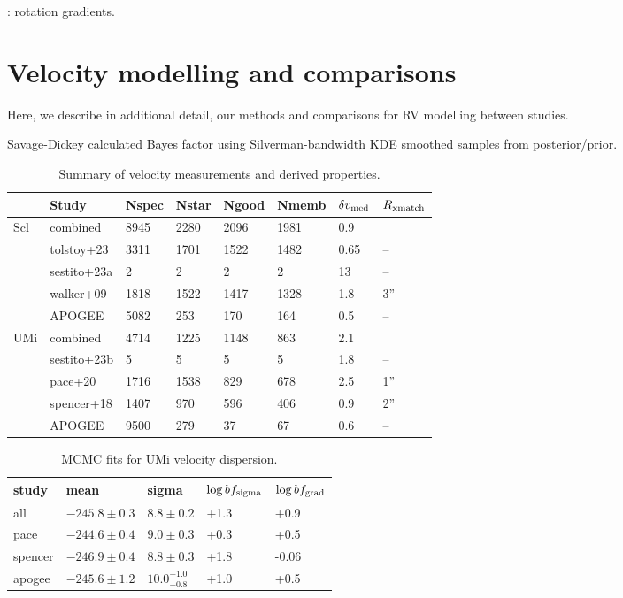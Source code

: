 \citet{martinez-garcia+2023}: rotation gradients.

\section{Velocity modelling and
comparisons}\label{velocity-modelling-and-comparisons}

Here, we describe in additional detail, our methods and comparisons for
RV modelling between studies.

Savage-Dickey calculated Bayes factor using Silverman-bandwidth KDE
smoothed samples from posterior/prior.

\begin{table*}[t]
\centering
\caption[Spectroscopic LOS velocity measurements]{Summary of velocity measurements and derived properties. }
\label{tbl:rv_measurements}
\begin{tabular}{llllllll}
\toprule
 & Study & Nspec & Nstar & Ngood & Nmemb & $\delta v_{\rm med}$ & $R_{\rm xmatch}$\\
\midrule
Scl & combined & 8945 & 2280 & 2096 & 1981 & 0.9 & \\
 & tolstoy+23 & 3311 & 1701 & 1522 & 1482 & 0.65 & –\\
 & sestito+23a & 2 & 2 & 2 & 2 & 13 & –\\
 & walker+09 & 1818 & 1522 & 1417 & 1328 & 1.8 & 3”\\
 & APOGEE & 5082 & 253 & 170 & 164 & 0.5 & –\\
UMi & combined & 4714 & 1225 & 1148 & 863 & 2.1 & \\
 & sestito+23b & 5 & 5 & 5 & 5 & 1.8 & –\\
 & pace+20 & 1716 & 1538 & 829 & 678 & 2.5 & 1”\\
 & spencer+18 & 1407 & 970 & 596 & 406 & 0.9 & 2”\\
 & APOGEE & 9500 & 279 & 37 & 67 & 0.6 & –\\
\bottomrule
\end{tabular}
\end{table*}



\begin{table*}[t]
\centering
\caption[Ursa Minor RV fits]{MCMC fits for UMi velocity dispersion. }
\label{tbl:umi_rv_mcmc}
\begin{tabular}{lllll}
\toprule
study & mean & sigma & $\log bf_{\rm sigma}$ & $\log bf_{\rm grad}$\\
\midrule
all & $-245.8\pm0.3$ & $8.8\pm0.2$ & +1.3 & +0.9\\
pace & $-244.6\pm0.4$ & $9.0\pm0.3$ & +0.3 & +0.5\\
spencer & $-246.9\pm0.4$ & $8.8\pm0.3$ & +1.8 & -0.06\\
apogee & $-245.6\pm1.2$ & $10.0_{-0.8}^{+1.0}$ & +1.0 & +0.5\\
\bottomrule
\end{tabular}
\end{table*}

